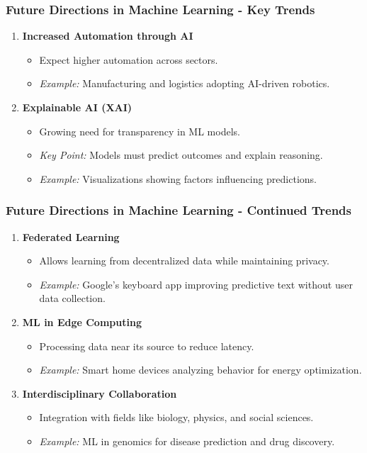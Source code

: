 \documentclass[aspectratio=169]{beamer}
\begin{document}
\begin{frame}[fragile]
    \frametitle{Future Directions in Machine Learning - Key Trends}
    \begin{enumerate}
        \item \textbf{Increased Automation through AI}
            \begin{itemize}
                \item Expect higher automation across sectors.
                \item \textit{Example:} Manufacturing and logistics adopting AI-driven robotics.
            \end{itemize}
        
        \item \textbf{Explainable AI (XAI)}
            \begin{itemize}
                \item Growing need for transparency in ML models.
                \item \textit{Key Point:} Models must predict outcomes and explain reasoning.
                \item \textit{Example:} Visualizations showing factors influencing predictions.
            \end{itemize}
    \end{enumerate}
\end{frame}

\begin{frame}[fragile]
    \frametitle{Future Directions in Machine Learning - Continued Trends}
    \begin{enumerate}[resume]
        \item \textbf{Federated Learning}
            \begin{itemize}
                \item Allows learning from decentralized data while maintaining privacy.
                \item \textit{Example:} Google’s keyboard app improving predictive text without user data collection.
            \end{itemize}

        \item \textbf{ML in Edge Computing}
            \begin{itemize}
                \item Processing data near its source to reduce latency.
                \item \textit{Example:} Smart home devices analyzing behavior for energy optimization.
            \end{itemize}

        \item \textbf{Interdisciplinary Collaboration}
            \begin{itemize}
                \item Integration with fields like biology, physics, and social sciences.
                \item \textit{Example:} ML in genomics for disease prediction and drug discovery.
            \end{itemize}
    \end{enumerate}
\end{frame}
\end{document}
